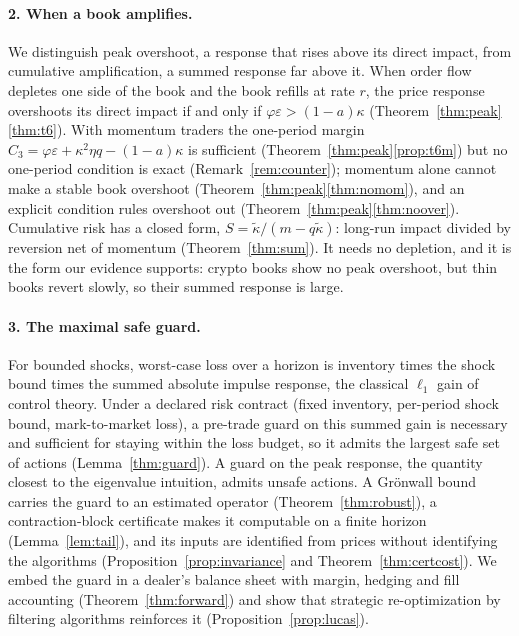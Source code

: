 \documentclass[12pt]{article}
\theoremstyle{definition}
\theoremstyle{remark}
\begin{document}
\paragraph{2. When a book amplifies.} We distinguish peak overshoot, a response that rises above its direct impact, from cumulative amplification, a summed response far above it. When order flow depletes one side of the book and the book refills at rate $r$, the price response overshoots its direct impact if and only if $\varphi\varepsilon>(1-a)\kappa$ (Theorem~\ref{thm:peak}\ref{thm:t6}). With momentum traders the one-period margin $C_3=\varphi\varepsilon+\kappa^2\eta q-(1-a)\kappa$ is sufficient (Theorem~\ref{thm:peak}\ref{prop:t6m}) but no one-period condition is exact (Remark~\ref{rem:counter}); momentum alone cannot make a stable book overshoot (Theorem~\ref{thm:peak}\ref{thm:nomom}), and an explicit condition rules overshoot out (Theorem~\ref{thm:peak}\ref{thm:noover}). Cumulative risk has a closed form, $S=\tilde\kappa/(m-q\tilde\kappa)$: long-run impact divided by reversion net of momentum (Theorem~\ref{thm:sum}). It needs no depletion, and it is the form our evidence supports: crypto books show no peak overshoot, but thin books revert slowly, so their summed response is large.

\paragraph{3. The maximal safe guard.} For bounded shocks, worst-case loss over a horizon is inventory times the shock bound times the summed absolute impulse response, the classical $\ell_1$ gain of control theory. Under a declared risk contract (fixed inventory, per-period shock bound, mark-to-market loss), a pre-trade guard on this summed gain is necessary and sufficient for staying within the loss budget, so it admits the largest safe set of actions (Lemma~\ref{thm:guard}). A guard on the peak response, the quantity closest to the eigenvalue intuition, admits unsafe actions. A Gr\"onwall bound carries the guard to an estimated operator (Theorem~\ref{thm:robust}), a contraction-block certificate makes it computable on a finite horizon (Lemma~\ref{lem:tail}), and its inputs are identified from prices without identifying the algorithms (Proposition~\ref{prop:invariance} and Theorem~\ref{thm:certcost}). We embed the guard in a dealer's balance sheet with margin, hedging and fill accounting (Theorem~\ref{thm:forward}) and show that strategic re-optimization by filtering algorithms reinforces it (Proposition~\ref{prop:lucas}).
\end{document}
